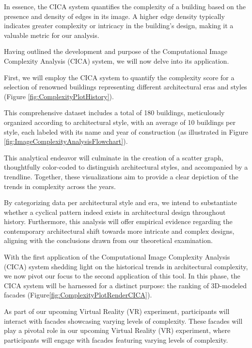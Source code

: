 In essence, the CICA system quantifies the complexity of a building based on the presence and density of edges in its image.
A higher edge density typically indicates greater complexity or intricacy in the building's design, making it a valuable metric for our analysis.

Having outlined the development and purpose of the Computational Image Complexity Analysis (CICA) system, we will now delve into its application.

First, we will employ the CICA system to quantify the complexity score for a selection of renowned buildings representing different architectural eras and styles (Figure \ref{fig:ComplexityPlotHistory}).

This comprehensive dataset includes a total of 180 buildings, meticulously organized according to architectural style, with an average of 10 buildings per style, each labeled with its name and year of construction (as illustrated in Figure \ref{fig:ImageComplexityAnalysisFlowchart}).

This analytical endeavor will culminate in the creation of a scatter graph, thoughtfully color-coded to distinguish architectural styles, and accompanied by a trendline.
Together, these visualizations aim to provide a clear depiction of the trends in complexity across the years.

By categorizing data per architectural style and era, we intend to substantiate whether a cyclical pattern indeed exists in architectural design throughout history.
Furthermore, this analysis will offer empirical evidence regarding the contemporary architectural shift towards more intricate and complex designs, aligning with the conclusions drawn from our theoretical examination.


With the first application of the Computational Image Complexity Analysis (CICA) system shedding light on the historical trends in architectural complexity, we now pivot our focus to the second application of this tool.
In this phase, the CICA system will be harnessed for a distinct purpose: the ranking of 3D-modeled facades (Figure\ref{fig:ComplexityPlotRenderCICA}).

As part of our upcoming Virtual Reality (VR) experiment, participants will interact with facades showcasing varying levels of complexity.
These facades will play a pivotal role in our upcoming Virtual Reality (VR) experiment, where participants will engage with facades featuring varying levels of complexity.

